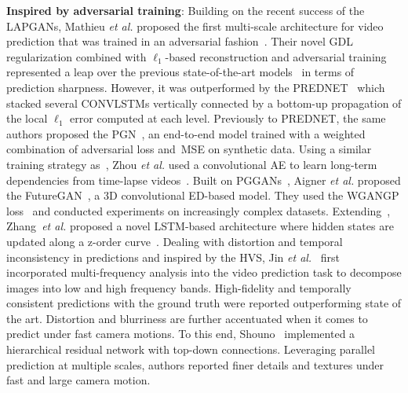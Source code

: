 \vspace*{0.1cm}\noindent\textbf{Inspired by adversarial training}: Building on the recent success of the \acp{LAPGAN}, Mathieu \textit{et al.} proposed the first multi-scale architecture for video prediction that was trained in an adversarial fashion~\cite{Mathieu2016}. Their novel \ac{GDL} regularization combined with $\ell_1$-based reconstruction and adversarial training represented a leap over the previous state-of-the-art models~\cite{Ranzato2014,Srivastava2015} in terms of prediction sharpness. However, it was outperformed by the \ac{PREDNET}~\cite{Lotter2017} which stacked several \acp{CONVLSTM} vertically connected by a bottom-up propagation of the local $\ell_1$ error computed at each level. Previously to \ac{PREDNET}, the same authors proposed the \ac{PGN}~\cite{Lotter2015}, an end-to-end model trained with a weighted combination of adversarial loss and~\ac{MSE} on synthetic data. Using a similar training strategy as~\cite{Mathieu2016}, Zhou \textit{et al.} used a convolutional \ac{AE} to learn long-term dependencies from time-lapse videos~\cite{Zhou2016}. Built on \acp{PGGAN}~\cite{Karras2018}, Aigner \textit{et al.} proposed the FutureGAN~\cite{Aigner2018}, a \ac{3D} convolutional \ac{ED}-based model. They used the \ac{WGANGP} loss~\cite{Gulrajani2017} and conducted experiments on increasingly complex datasets. Extending~\cite{Shi2015}, Zhang~\textit{et al.} proposed a novel \ac{LSTM}-based architecture where hidden states are updated along a z-order curve~\cite{Zhang2019}. Dealing with distortion and temporal inconsistency in predictions and inspired by the \ac{HVS}, Jin \textit{et al.}~\cite{Jin2020} first incorporated multi-frequency analysis into the video prediction task to decompose images into low and high frequency bands. High-fidelity and temporally consistent predictions with the ground truth were reported outperforming state of the art. Distortion and blurriness are further accentuated when it comes to predict under fast camera motions. To this end, Shouno~\cite{Shouno2020} implemented a hierarchical residual network with top-down connections. Leveraging parallel prediction at multiple scales, authors reported finer details and textures under fast and large camera motion.

